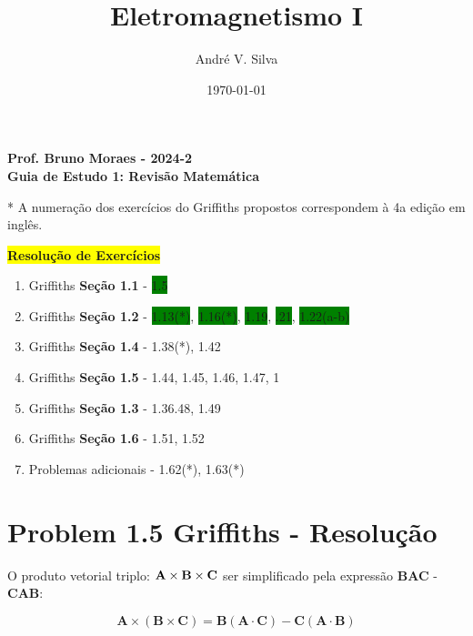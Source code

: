 \documentclass[a4paper,12pt]{article}
\title{ \textbf{\large Eletromagnetismo I }}
\author{Andr\'e V. Silva}
\date{\today}
\begin{document}
\maketitle

\begin{center}
    \textbf{Prof. Bruno Moraes - 2024-2}\\
    \textbf{Guia de Estudo 1: Revisão Matemática}
    \end{center}
    
    * A numeração dos exercícios do Griffiths propostos correspondem à 4a edição em inglês.\\
    
    \begin{center}
    \colorbox{yellow}{\textbf{Resolu\c{c}\~ao de Exerc\'icios}}
    \end{center}
    
    \begin{enumerate}
    \item Griffiths \textbf{Seção 1.1} - \colorbox{green}{1.5} 
    \item Griffiths \textbf{Seção 1.2} - \colorbox{green}{1.13(*)}, \colorbox{green}{1.16(*)}, \colorbox{green}{1.19}, \colorbox{green}{.21}, \colorbox{green}{1.22(a-b)}
    \item Griffiths \textbf{Seção 1.4} - 1.38(*), 1.42
    \item Griffiths \textbf{Seção 1.5} - 1.44, 1.45, 1.46, 1.47, 1
    \item Griffiths \textbf{Seção 1.3} - 1.36.48, 1.49
    \item Griffiths \textbf{Seção 1.6} - 1.51, 1.52
    \item Problemas adicionais - 1.62(*), 1.63(*)
    \end{enumerate}

\section*{Problem 1.5 Griffiths - Resolu\c{c}\~ao}

O produto vetorial triplo: $\textrm{\textbf{A}}\times\textrm{\textbf{B}}\times\textrm{\textbf{C}}$
ser simplificado pela express\~ao \textbf{BAC} - \textbf{CAB}:

\begin{equation}
    \textbf{A}\times(\textbf{B}\times\textbf{C}) =  \textbf{B}(\textbf{A}\cdot\textbf{C}) - \textbf{C}(\textbf{A}\cdot\textbf{B})
\end{equation}
\end{document}

